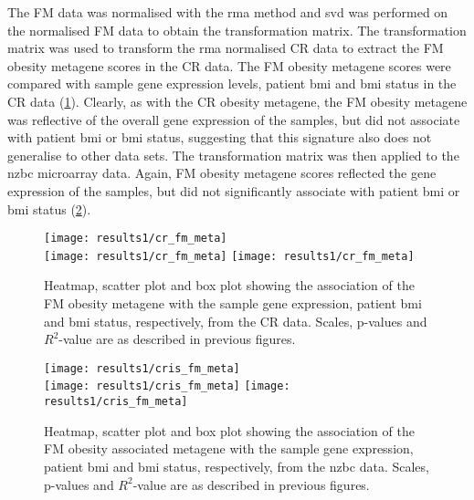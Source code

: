 The FM data was normalised with the \gls{rma} method and \gls{svd} was performed on the normalised FM data to obtain the transformation matrix.
The transformation matrix was used to transform the \gls{rma} normalised CR data to extract the FM obesity metagene scores in the CR data.
The FM obesity metagene scores were compared with sample gene expression levels, patient \gls{bmi} and \gls{bmi} status in the CR data (\cref{fig:fmmetacr}).
Clearly, as with the CR obesity metagene, the FM obesity metagene was reflective of the overall gene expression of the samples, but did not associate with patient \gls{bmi} or \gls{bmi} status, suggesting that this signature also does not generalise to other data sets.
The transformation matrix was then applied to the \gls{nzbc} microarray  data.
Again, FM obesity metagene scores reflected the gene expression of the samples, but did not significantly associate with patient \gls{bmi} or \gls{bmi} status (\cref{fig:fmmetacris}).

\begin{figure}[htp!]
	\centering
	\texttt{[image: results1/cr\_fm\_meta]}\\
	\texttt{[image: results1/cr\_fm\_meta]}
	\hfill
	\texttt{[image: results1/cr\_fm\_meta]}
	\caption[FM obesity metagene in the CR data]{Heatmap, scatter plot and box plot showing the association of the FM obesity metagene with the sample gene expression, patient \gls{bmi} and \gls{bmi} status, respectively, from the CR  data.
	Scales, p-values and $R^2$-value are as described in previous figures.}
	\label{fig:fmmetacr}
\end{figure}

\begin{figure}[htp!]
	\centering
	\texttt{[image: results1/cris\_fm\_meta]}\\
	\texttt{[image: results1/cris\_fm\_meta]}
	\hfill
	\texttt{[image: results1/cris\_fm\_meta]}
	\caption[FM metagene in the \gls{nzbc} data]{Heatmap, scatter plot and box plot showing the association of the FM obesity associated metagene with the sample gene expression, patient  \gls{bmi} and \gls{bmi} status, respectively, from the \gls{nzbc} data.
	Scales, p-values and $R^2$-value are as described in previous figures.}
	\label{fig:fmmetacris}
\end{figure}

